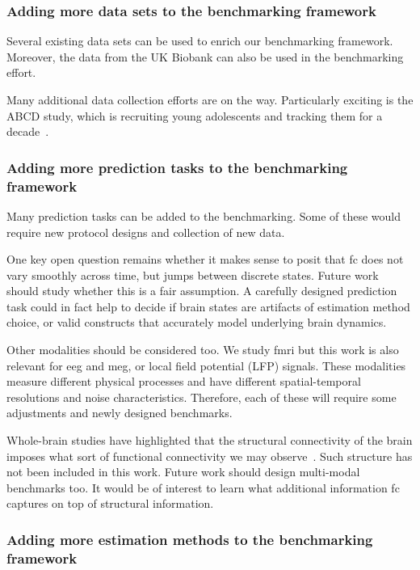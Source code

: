 \subsubsection{Adding more data sets to the benchmarking framework}

Several existing data sets can be used to enrich our benchmarking framework.
Moreover, the data from the UK Biobank can also be used in the benchmarking effort.

Many additional data collection efforts are on the way.
Particularly exciting is the ABCD study, which is recruiting young adolescents and tracking them for a decade~\parencite{Karcher2021}.

\subsubsection{Adding more prediction tasks to the benchmarking framework}
\label{subsec:spurious-brain-states}

Many prediction tasks can be added to the benchmarking.
Some of these would require new protocol designs and collection of new data.

One key open question remains whether it makes sense to posit that \gls{fc} does not vary smoothly across time, but jumps between discrete states.
Future work should study whether this is a fair assumption.
A carefully designed prediction task could in fact help to decide if brain states are artifacts of estimation method choice, or valid constructs that accurately model underlying brain dynamics.

Other modalities should be considered too.
We study \gls{fmri} but this work is also relevant for \gls{eeg} and \gls{meg}, or local field potential (LFP) signals.
These modalities measure different physical processes and have different spatial-temporal resolutions and noise characteristics.
Therefore, each of these will require some adjustments and newly designed benchmarks.

Whole-brain studies have highlighted that the structural connectivity of the brain imposes what sort of functional connectivity we may observe~\parencite{vandenHeuvel2009, Deco2011}.
Such structure has not been included in this work.
Future work should design multi-modal benchmarks too.
It would be of interest to learn what additional information \gls{fc} captures on top of structural information.

\subsubsection{Adding more estimation methods to the benchmarking framework}


